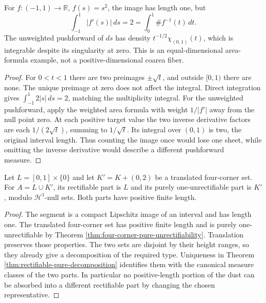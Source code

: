 \begin{example}\label{ex:area-fold-multiplicity}
For $f:(-1,1)\to\mathbb R$, $f(s)=s^2$, the image has length one, but
\[
 \int_{-1}^1|f'(s)|\,ds=2
 =\int_0^1\#f^{-1}(t)\,dt.
\]
The unweighted pushforward of $ds$ has density $t^{-1/2}\chi_{(0,1)}(t)$, which is integrable despite its singularity at zero. This is an equal-dimensional area-formula example, not a positive-dimensional coarea fiber.
\end{example}
\begin{proof}
For $0<t<1$ there are two preimages $\pm\sqrt t$, and outside $[0,1)$ there are none. The unique preimage at zero does not affect the integral. Direct integration gives $\int_{-1}^1 2|s|\,ds=2$, matching the multiplicity integral. For the unweighted pushforward, apply the weighted area formula with weight $1/|f'|$ away from the null point zero. At each positive target value the two inverse derivative factors are each $1/(2\sqrt t)$, summing to $1/\sqrt t$. Its integral over $(0,1)$ is two, the original interval length. Thus counting the image once would lose one sheet, while omitting the inverse derivative would describe a different pushforward measure.
\end{proof}

\begin{example}\label{ex:rectifiable-part-segment-dust}
Let $L=[0,1]\times\{0\}$ and let $K'=K+(0,2)$ be a translated four-corner set. For $A=L\cup K'$, its rectifiable part is $L$ and its purely one-unrectifiable part is $K'$, modulo $\mathcal H^1$-null sets. Both parts have positive finite length.
\end{example}
\begin{proof}
The segment is a compact Lipschitz image of an interval and has length one. The translated four-corner set has positive finite length and is purely one-unrectifiable by Theorem \ref{thm:four-corner-pure-unrectifiability}. Translation preserves those properties. The two sets are disjoint by their height ranges, so they already give a decomposition of the required type. Uniqueness in Theorem \ref{thm:rectifiable-pure-decomposition} identifies them with the canonical measure classes of the two parts. In particular no positive-length portion of the dust can be absorbed into a different rectifiable part by changing the chosen representative.
\end{proof}

